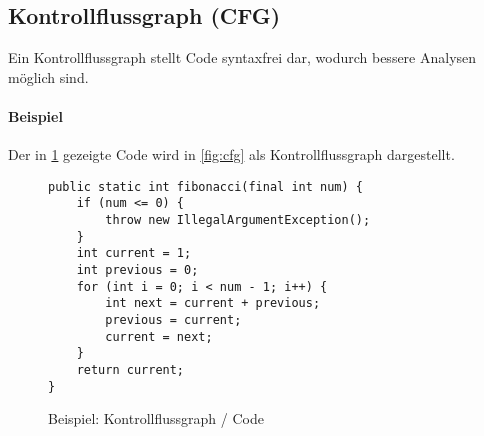 		\subsection{Kontrollflussgraph (CFG)}
			\label{diagram:cfg}

			Ein Kontrollflussgraph stellt Code syntaxfrei dar, wodurch bessere Analysen möglich sind.
			
			\paragraph{Beispiel}
				Der in \ref{fig:cfgcode} gezeigte Code wird in \ref{fig:cfg} als Kontrollflussgraph dargestellt.

				\begin{figure}[ht]
					\centering
					\begin{lstlisting}
public static int fibonacci(final int num) {
	if (num <= 0) {
		throw new IllegalArgumentException();
	}
	int current = 1;
	int previous = 0;
	for (int i = 0; i < num - 1; i++) {
		int next = current + previous;
		previous = current;
		current = next;
	}
	return current;
}
					\end{lstlisting}
					\caption{Beispiel: Kontrollflussgraph / Code}
					\label{fig:cfgcode}
				\end{figure}
				
